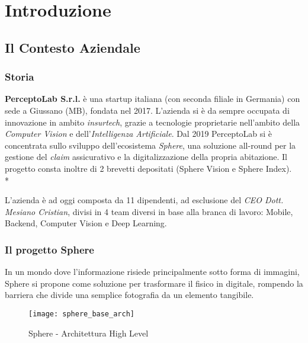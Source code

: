 \documentclass[../main.tex]{subfiles}
\begin{document}
    \chapter*{Introduzione}
    	
        \section*{Il Contesto Aziendale}
    	
    		\subsection*{Storia}
    		
    			\textbf{PerceptoLab S.r.l.} è una startup italiana (con seconda filiale in Germania) con sede a Giussano (MB), fondata nel 2017. L'azienda si è da sempre occupata di innovazione in ambito \emph{insurtech}, grazie a tecnologie proprietarie nell'ambito della \emph{Computer Vision} e dell'\emph{Intelligenza Artificiale}. Dal 2019 PerceptoLab si è concentrata sullo sviluppo dell'ecosistema \emph{Sphere}, una soluzione all-round per la gestione del \emph{claim} assicurativo e la digitalizzazione della propria abitazione. Il progetto consta inoltre di 2 brevetti depositati (Sphere Vision e Sphere Index).\\*
    			
    			L'azienda è ad oggi composta da 11 dipendenti, ad esclusione del \emph{CEO Dott. Mesiano Cristian}, divisi in 4 team diversi in base alla branca di lavoro: Mobile, Backend, Computer Vision e Deep Learning.
    		
    		\subsection*{Il progetto Sphere}
    		
    			In un mondo dove l'informazione risiede principalmente sotto forma di immagini, Sphere si propone come soluzione per trasformare il fisico in digitale, rompendo la barriera che divide una semplice fotografia da un elemento tangibile.
    			
    			\begin{figure}[H]
            		\centering
            		\texttt{[image: sphere\_base\_arch]}
            		\caption{Sphere - Architettura High Level}
            		\label{fig:sphere_base_arch}
        	    \end{figure}
    			
\end{document}
